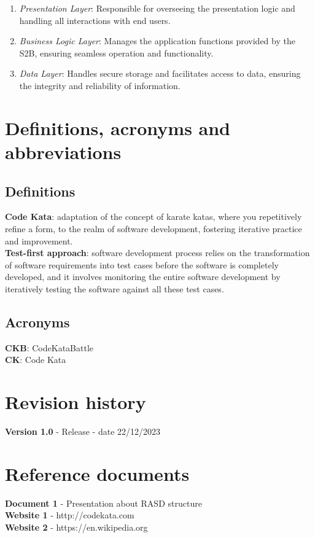 \documentclass[12pt, a4paper]{report}
\begin{document}
        \begin{enumerate}
            \item \textit{Presentation Layer}: Responsible for overseeing the presentation logic and handling all interactions with end users.
            \item \textit{Business Logic Layer}: Manages the application functions provided by the S2B, ensuring seamless operation and functionality.
            \item \textit{Data Layer}: Handles secure storage and facilitates access to data, ensuring the integrity and reliability of information.
        \end{enumerate}

    \section{Definitions, acronyms and abbreviations}
    \subsection{Definitions}
    \textbf{Code Kata}: adaptation of the concept of karate katas, where you repetitively refine a form, to the realm of software development, 
        fostering iterative practice and improvement. 
    \\
    \textbf{Test-first approach}:  software development process relies on the transformation of software requirements into test cases before 
        the software is completely developed, and it involves monitoring the entire software development by iteratively testing the software 
        against all these test cases.
    \subsection{Acronyms}
    \textbf{CKB}: CodeKataBattle 
    \\
    \textbf{CK}: Code Kata
    

    \section{Revision history}
    \textbf{Version 1.0} - Release - date 22/12/2023


    \section{Reference documents}
    \textbf{Document 1} - Presentation about RASD structure
    \\
    \textbf{Website 1} - http://codekata.com
    \\
    \textbf{Website 2} - https://en.wikipedia.org
\end{document}

